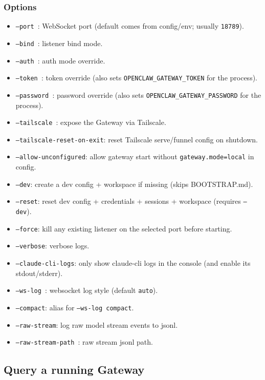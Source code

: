 \subsubsection{Options}


\begin{itemize}
  \item \texttt{--port }: WebSocket port (default comes from config/env; usually \texttt{18789}).
  \item \texttt{--bind }: listener bind mode.
  \item \texttt{--auth }: auth mode override.
  \item \texttt{--token }: token override (also sets \texttt{OPENCLAW\_GATEWAY\_TOKEN} for the process).
  \item \texttt{--password }: password override (also sets \texttt{OPENCLAW\_GATEWAY\_PASSWORD} for the process).
  \item \texttt{--tailscale }: expose the Gateway via Tailscale.
  \item \texttt{--tailscale-reset-on-exit}: reset Tailscale serve/funnel config on shutdown.
  \item \texttt{--allow-unconfigured}: allow gateway start without \texttt{gateway.mode=local} in config.
  \item \texttt{--dev}: create a dev config + workspace if missing (skips BOOTSTRAP.md).
  \item \texttt{--reset}: reset dev config + credentials + sessions + workspace (requires \texttt{--dev}).
  \item \texttt{--force}: kill any existing listener on the selected port before starting.
  \item \texttt{--verbose}: verbose logs.
  \item \texttt{--claude-cli-logs}: only show claude-cli logs in the console (and enable its stdout/stderr).
  \item \texttt{--ws-log }: websocket log style (default \texttt{auto}).
  \item \texttt{--compact}: alias for \texttt{--ws-log compact}.
  \item \texttt{--raw-stream}: log raw model stream events to jsonl.
  \item \texttt{--raw-stream-path }: raw stream jsonl path.
\end{itemize}


\subsection{Query a running Gateway}


